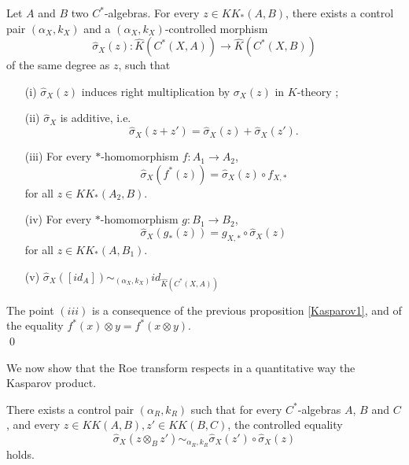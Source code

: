 \begin{prop}
Let $A$ and $B$ two $C^*$-algebras. For every $z\in KK_*(A,B)$, there exists a control pair $(\alpha_X,k_X)$ and a $(\alpha_X,k_X)$-controlled morphism
\[\hat\sigma_X(z) : \hat K(C^*(X,A))\rightarrow \hat K(C^*(X,B))\]
of the same degree as $z$, such that
\begin{enumerate}
\item[(i)] $\hat\sigma_X(z)$ induces right multiplication by $\sigma_X(z)$ in $K$-theory ;
\item[(ii)] $\hat\sigma_X$ is additive, i.e.
\[\hat\sigma_X(z+z')=\hat\sigma_X(z)+\hat\sigma_X(z').\]
\item[(iii)] For every $*$-homomorphism $f : A_1\rightarrow A_2$,
\[\hat\sigma_X(f^*(z))=\hat\sigma_X(z)\circ f_{X,*}\] for all $z\in KK_*(A_2,B)$.
\item[(iv)] For every $*$-homomorphism $g : B_1\rightarrow B_2$,
\[\hat\sigma_X(g_*(z))= g_{X,*}\circ \hat\sigma_X(z)\] for all $z\in KK_*(A,B_1)$.
\item[(v)] $\hat\sigma_X([id_A]) \sim_{(\alpha_X,k_X)} id_{\hat K(C^*(X,A))}$
\end{enumerate}
\end{prop}

\begin{dem}
The point $(iii)$ is a consequence of the previous proposition \ref{Kasparov1}, and of the equality $f^*(x)\otimes y = f^*(x\otimes y)$.\\
\qed
\end{dem}

We now show that the Roe transform respects in a quantitative way the Kasparov product.

\begin{prop} There exists a control pair $(\alpha_R,k_R)$ such that for every $C^*$-algebras $A$, $B$ and $C$, and every $z\in KK(A,B),z'\in KK(B,C)$, the controlled equality
\[\hat\sigma_X(z\otimes_B z') \sim_{\alpha_R,k_R} \hat\sigma_X(z')\circ \hat\sigma_X(z)\]
holds.
\end{prop}

